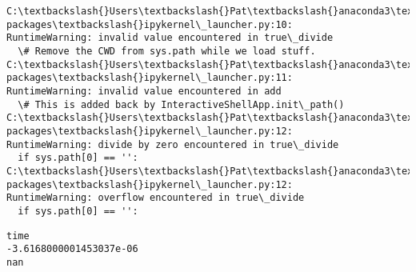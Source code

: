 \documentclass[11pt]{article}
\begin{document}
\begin{Verbatim}[commandchars=\\\{\}]
C:\textbackslash{}Users\textbackslash{}Pat\textbackslash{}anaconda3\textbackslash{}lib\textbackslash{}site-packages\textbackslash{}ipykernel\_launcher.py:10:
RuntimeWarning: invalid value encountered in true\_divide
  \# Remove the CWD from sys.path while we load stuff.
C:\textbackslash{}Users\textbackslash{}Pat\textbackslash{}anaconda3\textbackslash{}lib\textbackslash{}site-packages\textbackslash{}ipykernel\_launcher.py:11:
RuntimeWarning: invalid value encountered in add
  \# This is added back by InteractiveShellApp.init\_path()
C:\textbackslash{}Users\textbackslash{}Pat\textbackslash{}anaconda3\textbackslash{}lib\textbackslash{}site-packages\textbackslash{}ipykernel\_launcher.py:12:
RuntimeWarning: divide by zero encountered in true\_divide
  if sys.path[0] == '':
C:\textbackslash{}Users\textbackslash{}Pat\textbackslash{}anaconda3\textbackslash{}lib\textbackslash{}site-packages\textbackslash{}ipykernel\_launcher.py:12:
RuntimeWarning: overflow encountered in true\_divide
  if sys.path[0] == '':
    \end{Verbatim}

    \begin{Verbatim}[commandchars=\\\{\}]
time
-3.6168000001453037e-06
nan
    \end{Verbatim}
\end{document}
